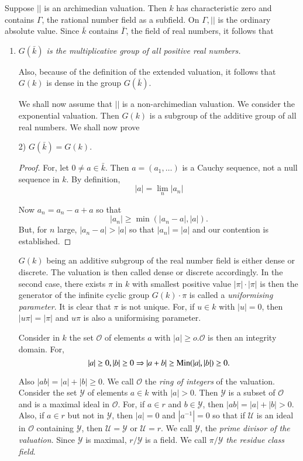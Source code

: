 Suppose $| |$ is an archimedian valuation. Then $k$ has characteristic
zero and contains $\Gamma$, the rational number field as a
subfield. On $\Gamma, | |$ is the ordinary absolute value. Since
$\bar{k}$ contains $\bar{\Gamma}$, the field of real numbers, it
follows that
\begin{enumerate}[1)]
\item \textit{$G(\bar{k})$ is the multiplicative group of all positive
  real numbers.} 

Also, because of the definition of the extended valuation, it follows
that $G(k)$ is dense in the group $G(\bar{k})$. 

We shall now assume that $| |$ is a non-archimedian valuation. We
consider the exponential valuation. Then $G(k)$ is a subgroup of the
additive group of all real numbers. We shall now prove 

\item[2)] $G(\bar{k}) = G(k)$.

 \begin{proof}%
For, let $0 \neq a \in \bar{k}$. Then $a = (a_1 , \ldots)$ is a Cauchy
sequence, not a null sequence in $k$. By definition, 
$$
|a| = \lim_n |a_n|
$$

Now $a_n = a_n - a + a$ so that 
$$
|a_n| \ge \min (|a_n - a| , |a| ).
$$
But, for $n$ large, $|a_n - a| > |a|$ so that $|a_n| = |a|$ and our
contention is established. 
 \end{proof} 
 
 $G(k)$ being an additive subgroup of the real number field is either
 dense or discrete. The valuation is then called dense or discrete
 accordingly. In the second case, there exists $\pi$ in $k$ with\pageoriginale
 smallest positive value $|\pi| \cdot |\pi|$ is then the generator of the
 infinite cyclic group $G(k) \cdot \pi$ is called a \textit{uniformising
   parameter}. It is clear that $\pi$ is not unique. For, if $u \in k$
 with $|u| = 0$, then $|u \pi| = |\pi|$ and $u \pi$ is also a
 uniformising parameter. 
 
 Consider in $k$ the set $\mathscr{O}$ of elements $a$  with $|a| \ge
 o. \mathscr{O}$ is then an integrity domain. For, 
$$
|a| \ge 0, |b| \ge 0 \Rightarrow |a + b| \ge \operatorname{Min} (|a| , |b|) \ge 0. 
$$ 

Also $|ab| = |a| + |b| \ge 0$. We call $\mathscr{O}$ the \textit{ring
  of integers} of the valuation. Consider the set $\mathscr{Y}$ of
elements $a \in k$ with $|a| > 0$. Then $\mathscr{Y}$ is a subset of
$\mathscr{O}$ and is a maximal ideal in $\mathscr{O}$. For, if $a \in
r$ and $b \in \mathscr{Y}$, then $|ab| = |a| + |b| > 0$. Also, if $a
\in r$ but not in $\mathscr{Y}$, then $|a| = 0$ and $|a^{-1}| = 0$ so
that if $\mathscr{U}$ is an ideal in $\mathscr{O}$ containing
$\mathscr{Y}$, then $\mathscr{U} = \mathscr{Y}$ or $\mathscr{U} =
r$. We call $\mathscr{Y}$, the \textit{prime divisor of the
  valuation}. Since $\mathscr{Y}$ is maximal, $r/\mathscr{Y}$ is a
field. We call $\pi/ \mathscr{Y}$  \textit{the residue class field}. 
 

\end{enumerate}
